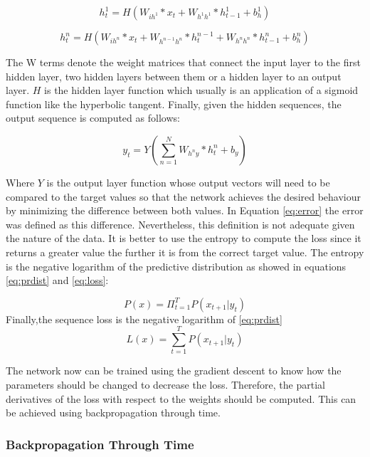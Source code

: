 \begin{equation} \label{eq:hidden1}
h_t^1= H( W_{ih^1} * x_t + W_{h^1 h^1}*h^1_{t-1} + b^1_h)
\end{equation}

\begin{equation} \label{eq:hidden}
h_t^n= H(W_{ih^n} * x_t + W_{h^{n-1}  h^n} * h^{n-1}_t +W_{h^n h^n} * h^n_{t-1}+ b^n_h)
\end{equation}

The W terms denote the weight matrices that connect the input layer to the first hidden layer, two hidden layers between them or a hidden layer to an output layer. $H$ is the hidden layer function which usually is an application of a sigmoid function like the hyperbolic tangent. Finally, given the hidden sequences, the output sequence is computed as follows:

\begin{equation} \label{eq:output}
y_t=Y(\sum_{n=1}^{N} W_{h^{n}y} * h^n_t + b_y)
\end{equation}

Where $Y$ is the output layer function whose output vectors will need to be compared to the target values so that the network achieves the desired behaviour by minimizing the difference between both values. In Equation \ref{eq:error} the error was defined as this difference. Nevertheless, this definition is not adequate given the nature of the data. It is better to use the entropy to compute the loss since it returns a greater value the further it is from the correct target  value. The entropy is the negative logarithm of the predictive distribution as showed in equations \ref{eq:prdist} and \ref{eq:loss}:

\begin{equation} \label{eq:prdist}
P(x)=\Pi_{t=1}^{T} P(x_{t+1}|y_t)
\end{equation}
Finally,the sequence loss is the negative logarithm of \ref{eq:prdist}
\begin{equation} \label{eq:loss}
L(x)=\sum_{t=1}^{T} P(x_{t+1}|y_t)
\end{equation}

The network now can be trained using the gradient descent to know how the parameters should be changed to decrease the loss. Therefore, the partial derivatives of the loss with respect to the weights should be computed. This can be achieved using backpropagation through time.


\subsubsection{Backpropagation Through Time}


